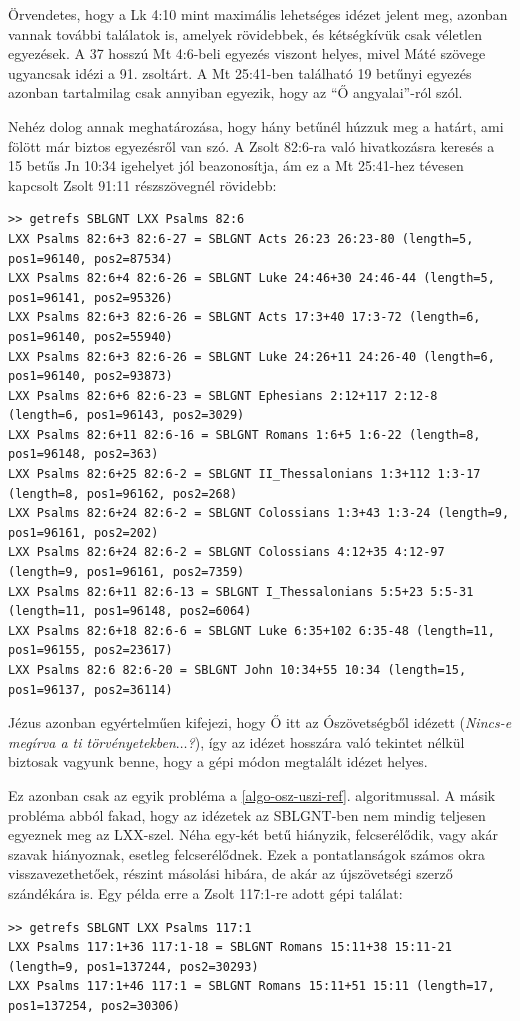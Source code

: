 \documentclass{article}
\begin{document}
Örvendetes, hogy a Lk 4:10 mint maximális lehetséges idézet jelent meg, azonban vannak további találatok is,
amelyek rövidebbek, és kétségkívük csak véletlen egyezések. A 37 hosszú Mt 4:6-beli egyezés viszont
helyes, mivel Máté szövege ugyancsak idézi a 91. zsoltárt. A Mt 25:41-ben található 19
betűnyi egyezés azonban tartalmilag csak annyiban egyezik, hogy az ``Ő angyalai''-ról szól.

Nehéz dolog annak meghatározása, hogy hány betűnél húzzuk meg a határt, ami fölött már biztos
egyezésről van szó. A Zsolt 82:6-ra való hivatkozásra keresés a 15 betűs Jn 10:34 igehelyet
jól beazonosítja, ám ez a Mt 25:41-hez tévesen kapcsolt Zsolt 91:11 részszövegnél rövidebb:
\begin{lstlisting}
>> getrefs SBLGNT LXX Psalms 82:6
LXX Psalms 82:6+3 82:6-27 = SBLGNT Acts 26:23 26:23-80 (length=5, pos1=96140, pos2=87534)
LXX Psalms 82:6+4 82:6-26 = SBLGNT Luke 24:46+30 24:46-44 (length=5, pos1=96141, pos2=95326)
LXX Psalms 82:6+3 82:6-26 = SBLGNT Acts 17:3+40 17:3-72 (length=6, pos1=96140, pos2=55940)
LXX Psalms 82:6+3 82:6-26 = SBLGNT Luke 24:26+11 24:26-40 (length=6, pos1=96140, pos2=93873)
LXX Psalms 82:6+6 82:6-23 = SBLGNT Ephesians 2:12+117 2:12-8 (length=6, pos1=96143, pos2=3029)
LXX Psalms 82:6+11 82:6-16 = SBLGNT Romans 1:6+5 1:6-22 (length=8, pos1=96148, pos2=363)
LXX Psalms 82:6+25 82:6-2 = SBLGNT II_Thessalonians 1:3+112 1:3-17 (length=8, pos1=96162, pos2=268)
LXX Psalms 82:6+24 82:6-2 = SBLGNT Colossians 1:3+43 1:3-24 (length=9, pos1=96161, pos2=202)
LXX Psalms 82:6+24 82:6-2 = SBLGNT Colossians 4:12+35 4:12-97 (length=9, pos1=96161, pos2=7359)
LXX Psalms 82:6+11 82:6-13 = SBLGNT I_Thessalonians 5:5+23 5:5-31 (length=11, pos1=96148, pos2=6064)
LXX Psalms 82:6+18 82:6-6 = SBLGNT Luke 6:35+102 6:35-48 (length=11, pos1=96155, pos2=23617)
LXX Psalms 82:6 82:6-20 = SBLGNT John 10:34+55 10:34 (length=15, pos1=96137, pos2=36114)
\end{lstlisting}
Jézus azonban egyértelműen kifejezi, hogy Ő itt az Ószövetségből idézett (\textit{Nincs-e
megírva a ti törvényetekben$\ldots$?}), így az idézet hosszára való tekintet
nélkül biztosak vagyunk benne, hogy a gépi módon megtalált idézet helyes.

Ez azonban csak az egyik probléma a \ref{algo-osz-uszi-ref}. algoritmussal.
A másik probléma abból fakad, hogy az idézetek az SBLGNT-ben nem mindig teljesen egyeznek meg
az LXX-szel. Néha egy-két betű hiányzik, felcserélődik, vagy akár szavak hiányoznak, esetleg
felcserélődnek. Ezek a pontatlanságok számos okra visszavezethetőek, részint másolási
hibára, de akár az újszövetségi szerző szándékára is.
Egy példa erre a Zsolt 117:1-re adott gépi találat:
\begin{lstlisting}
>> getrefs SBLGNT LXX Psalms 117:1
LXX Psalms 117:1+36 117:1-18 = SBLGNT Romans 15:11+38 15:11-21 (length=9, pos1=137244, pos2=30293)
LXX Psalms 117:1+46 117:1 = SBLGNT Romans 15:11+51 15:11 (length=17, pos1=137254, pos2=30306)
\end{lstlisting}
\end{document}
